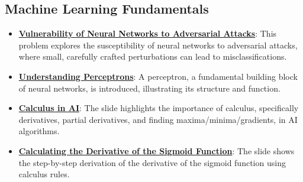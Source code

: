 \documentclass{article}%
\begin{document}
\subsection{Machine Learning Fundamentals}%
\label{subsec:MachineLearningFundamentals}%
\begin{itemize}[leftmargin=*]%
\item \href{\url{https://purdue.brightspace.com/d2l/common/assets/pdfjs-d2l-dist/1.0.14-legacy/web/viewer.html?file=\%252Fcontent\%252Fenforced\%252F1095467-wl.202510.CS.24300.001\%252F02L2-Intro.pdf\%253Fou\%253D1095467\&lang=en-us\&container=d2l-fileviewer-rendered-pdf\&fullscreen=d2l-fileviewer-rendered-pdf-dialog\&height=667}#page=19}{\textbf{Vulnerability of Neural Networks to Adversarial Attacks}}: This problem explores the susceptibility of neural networks to adversarial attacks, where small, carefully crafted perturbations can lead to misclassifications.%
\item \href{\url{https://purdue.brightspace.com/d2l/common/assets/pdfjs-d2l-dist/1.0.14-legacy/web/viewer.html?file=\%252Fcontent\%252Fenforced\%252F1095467-wl.202510.CS.24300.001\%252F04L1-Linear\%20Algebra\%20Primer.pdf\%253Fou\%253D1095467\&lang=en-us\&container=d2l-fileviewer-rendered-pdf\&fullscreen=d2l-fileviewer-rendered-pdf-dialog\&height=667}#page=17}{\textbf{Understanding Perceptrons}}: A perceptron, a fundamental building block of neural networks, is introduced, illustrating its structure and function.%
\item \href{\url{https://purdue.brightspace.com/d2l/common/assets/pdfjs-d2l-dist/1.0.14-legacy/web/viewer.html?file=\%252Fcontent\%252Fenforced\%252F1095467-wl.202510.CS.24300.001\%252F04L1-Linear\%20Algebra\%20Primer.pdf\%253Fou\%253D1095467\&lang=en-us\&container=d2l-fileviewer-rendered-pdf\&fullscreen=d2l-fileviewer-rendered-pdf-dialog\&height=667}#page=19}{\textbf{Calculus in AI}}: The slide highlights the importance of calculus, specifically derivatives, partial derivatives, and finding maxima/minima/gradients, in AI algorithms.%
\item \href{\url{https://purdue.brightspace.com/d2l/common/assets/pdfjs-d2l-dist/1.0.14-legacy/web/viewer.html?file=\%252Fcontent\%252Fenforced\%252F1095467-wl.202510.CS.24300.001\%252F04L1-Linear\%20Algebra\%20Primer.pdf\%253Fou\%253D1095467\&lang=en-us\&container=d2l-fileviewer-rendered-pdf\&fullscreen=d2l-fileviewer-rendered-pdf-dialog\&height=667}#page=21}{\textbf{Calculating the Derivative of the Sigmoid Function}}: The slide shows the step-by-step derivation of the derivative of the sigmoid function using calculus rules.%

\end{itemize}
\end{document}
